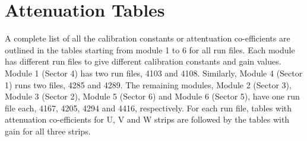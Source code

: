 \section{Attenuation Tables}
A complete list of all the calibration constants or attentuation co-efficients are outlined in
the tables starting from module 1 to 6 for all run files. Each module has different run files
to give different calibration constants and gain values. Module 1 (Sector 4) has two run files, 
4103 and 4108. Similarly, Module 4 (Sector 1) runs two files, 4285 and 4289. The remaining
modules, Module 2 (Sector 3), Module 3 (Sector 2), Module 5 (Sector 6) and Module 6 (Sector 5),
have one run file each, 4167, 4205, 4294 and 4416, respectively. For each run file, tables with
attenuation co-efficients for U, V and W strips are followed by the tables with gain for all
three strips.


